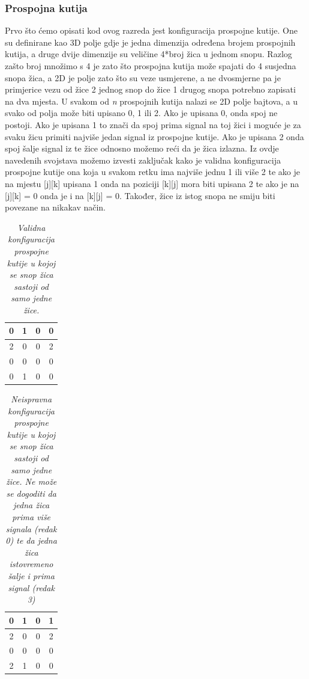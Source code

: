 \documentclass[times, utf8, zavrsni]{fer}
\begin{document}
\subsubsection{Prospojna kutija}

Prvo što ćemo opisati kod ovog razreda jest konfiguracija prospojne kutije. One su definirane kao 3D polje gdje je jedna dimenzija određena brojem prospojnih kutija, a druge dvije dimenzije su veličine 4*broj žica u jednom snopu. Razlog zašto broj množimo s 4 je zato što prospojna kutija može spajati do 4 susjedna snopa žica, a 2D je polje zato što su veze usmjerene, a ne dvosmjerne pa je primjerice vezu od žice 2 jednog snop do žice 1 drugog snopa potrebno zapisati na dva mjesta. U svakom od \emph{n} prospojnih kutija nalazi se 2D polje bajtova, a u svako od polja može biti upisano 0, 1 ili 2. Ako je upisana 0, onda spoj ne postoji. Ako je upisana 1 to znači da spoj prima signal na toj žici i moguće je za svaku žicu primiti najviše jedan signal iz prospojne kutije. Ako je upisana 2 onda spoj šalje signal iz te žice odnosno možemo reći da je žica izlazna. Iz ovdje navedenih svojstava možemo izvesti zaključak kako je validna konfiguracija prospojne kutije ona koja u svakom retku ima najviše jednu 1 ili više 2 te ako je na mjestu [j][k] upisana 1 onda na poziciji [k][j] mora biti upisana 2 te ako je na [j][k] = 0 onda je i na [k][j] = 0. Također, žice iz istog snopa ne smiju biti povezane na nikakav način.


 \begin{table}[htb]
	\caption{\emph{Validna konfiguracija prospojne kutije u kojoj se snop žica sastoji od samo jedne žice.}}
	\label{swConfValid}
	\centering
	\begin{tabular}{|c|c|c|c|} \hline
		0 & 1 & 0 & 0 \\ \hline
		2 & 0 & 0 & 2 \\ \hline
		0 & 0 & 0 & 0 \\ \hline
		0 & 1 & 0 & 0 \\ \hline
	\end{tabular}
\end{table}


 \begin{table}[!htb]
	\caption{\emph{Neispravna konfiguracija prospojne kutije u kojoj se snop žica sastoji od samo jedne žice. Ne može se dogoditi da jedna žica prima više signala (redak 0) te da jedna žica istovremeno šalje i prima signal (redak 3) }}
	\label{swConfInvalid}
	\centering
	\begin{tabular}{|c|c|c|c|} \hline
		0 & 1 & 0 & 1 \\ \hline
		2 & 0 & 0 & 2 \\ \hline
		0 & 0 & 0 & 0 \\ \hline
		2 & 1 & 0 & 0 \\ \hline
	\end{tabular}
\end{table}
\end{document}
